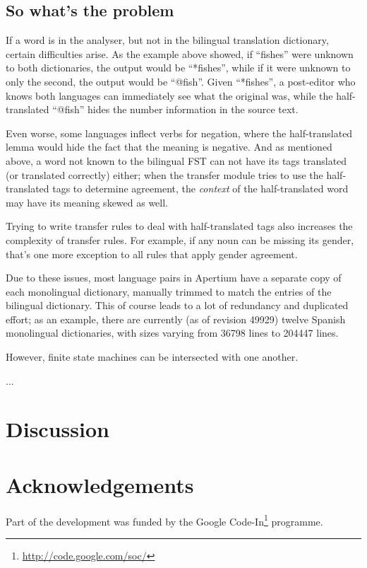 \documentclass[11pt]{article}
\begin{document}
\subsection{So what's the problem}

If a word is in the analyser, but not in the bilingual translation
dictionary, certain difficulties arise. As the example above showed,
if ``fishes'' were unknown to both dictionaries, the output would be
``*fishes'', while if it were unknown to only the second, the output
would be ``@fish''. Given ``*fishes'', a post-editor who knows both
languages can immediately see what the original was, while the
half-translated ``@fish'' hides the number information in the source
text. 

Even worse, some languages inflect verbs for negation, where the
half-translated lemma would hide the fact that the meaning is
negative. And as mentioned above, a word not known to the bilingual
FST can not have its tags translated (or translated correctly) either;
when the transfer module tries to use the half-translated tags to
determine agreement, the \emph{context} of the half-translated word
may have its meaning skewed as well.

Trying to write transfer rules to deal with half-translated tags also
increases the complexity of transfer rules. For example, if any noun
can be missing its gender, that's one more exception to all rules that
apply gender agreement.

Due to these issues, most language pairs in Apertium have a separate copy of
each monolingual dictionary, manually trimmed to match the entries of the
bilingual dictionary. This of course leads to a lot of redundancy and
duplicated effort; as an example, there are currently (as of revision 49929)
twelve Spanish monolingual dictionaries, with sizes varying from 36798 lines to
204447 lines.


However, finite state machines can be intersected with one another.

...

\section{Discussion}
\section*{Acknowledgements}
Part of the development was funded by the Google
Code-In\footnote{\href{http://code.google.com/soc/}{http://code.google.com/soc/}
} programme.




\end{document}
